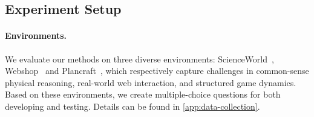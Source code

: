\documentclass{article}
\theoremstyle{plain}
\theoremstyle{definition}
\theoremstyle{remark}
\begin{document}
\subsection{Experiment Setup} \label{sec:exp_setup}
\paragraph{Environments.} We evaluate our methods on three diverse environments: ScienceWorld~\citep{scienceworld2022}, Webshop~\citep{yao2022webshop} and Plancraft~\citep{dagan2024Plancraft}, which respectively capture challenges in common-sense physical reasoning, real-world web interaction, and structured game dynamics. Based on these environments, we create multiple-choice questions for both developing and testing. Details can be found in \cref{app:data-collection}.
\end{document}
